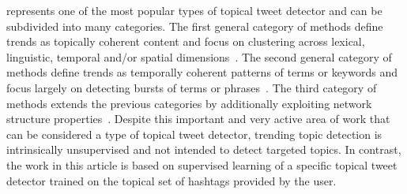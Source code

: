 \vspace{2mm}
 represents one of the most popular
types of topical tweet detector and can be subdivided into many categories.  The
first general category of methods define trends as topically coherent
content and focus on clustering across lexical, linguistic, temporal
and/or spatial
dimensions~\cite{petrovic,ishikawa,murata,becker,tweetmotif,wangLee}.
The second general category of methods define trends as temporally
coherent patterns of terms or keywords and focus largely on detecting
bursts of terms or
phrases~\cite{mathioudakis,cuiZhang,zhaoSports,nichols,aiello}.
%
The third category of methods extends the previous categories by
additionally exploiting network structure properties~\cite{budak}.
Despite this important and very active area of work that can be
considered a type of topical tweet detector, trending topic detection is
intrinsically unsupervised and not intended to detect targeted topics.
In contrast, the work in this article is based on supervised learning of
a specific topical tweet detector trained on the topical set of
hashtags provided by the user.

%

%

